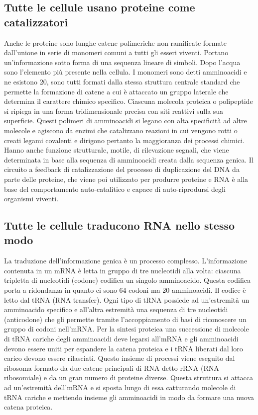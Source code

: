 \subsection{Tutte le cellule usano proteine come catalizzatori}
Anche le proteine sono lunghe catene polimeriche non ramificate formate dall'unione in serie di monomeri comuni a tutti gli esseri viventi. Portano 
un'informazione sotto forma di una sequenza lineare di simboli. Dopo l'acqua sono l'elemento pi\`u presente nella cellula. I monomeri sono detti amminoacidi
e ne esistono 20, sono tutti formati dalla stessa struttura centrale standard che permette la formazione di catene a cui \`e attaccato un gruppo laterale 
che determina il carattere chimico specifico. Ciascuna molecola proteica o polipeptide si ripiega in una forma tridimensionale precisa con siti reattivi 
sulla sua superficie. Questi polimeri di amminoacidi si legano con alta specificit\`a ad altre molecole e agiscono da enzimi che catalizzano reazioni in cui
vengono rotti o creati legami covalenti e dirigono pertanto la maggioranza dei processi chimici. Hanno anche funzione strutturale, motile, di rilevazione
segnali, che viene determinata in base alla sequenza di amminoacidi creata dalla sequenza genica. Il circuito a feedback di catalizzazione del processo di
duplicazione del DNA da parte delle proteine, che viene poi utilizzato per produrre proteine e RNA \`e alla base del comportamento auto-catalitico e capace 
di auto-riprodursi degli organismi viventi. 
\subsection{Tutte le cellule traducono RNA nello stesso modo}
La traduzione dell'informazione genica \`e un processo complesso. L'informazione contenuta in un mRNA \`e letta in gruppo di tre nucleotidi alla volta: 
ciascuna tripletta di nucleotidi (codone) codifica un singolo amminoacido. Questa codifica porta a ridondanza in quanto ci sono 64 codoni ma 20 amminoacidi.
Il codice \`e letto dal tRNA (RNA transfer). Ogni tipo di tRNA possiede ad un'estremit\`a un amminoacido specifico e all'altra estremit\`a una sequenza di
tre nucleotidi (anticodone) che gli permette tramite l'accoppiamento di basi di riconoscere un gruppo di codoni nell'mRNA. Per la sintesi proteica una 
successione di molecole di tRNA cariche degli amminoacidi deve legarsi all'mRNA e gli amminoacidi devono essere uniti per espandere la catena proteica e i 
tRNA liberati dal loro carico devono essere rilasciati. Questo insieme di processi viene eseguito dal ribosoma formato da due catene principali di RNA
detto rRNA (RNA ribosomiale) e da un gran numero di proteine diverse. Questa struttura si attacca ad un'estremit\`a dell'mRNA e si sposta lungo di essa
catturando molecole di tRNA cariche e mettendo insieme gli amminoacidi in modo da formare una nuova catena proteica. 
